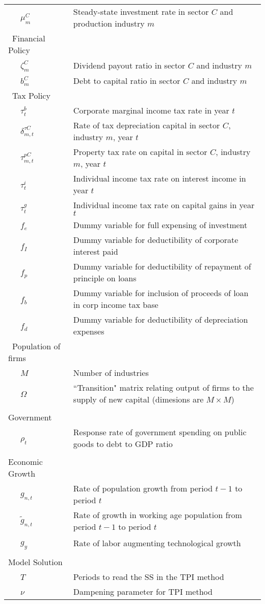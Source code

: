 \documentclass[letterpaper,12pt]{article}
\theoremstyle{definition}
\begin{document}
\begin{table}[h!]
\begin{tabular}{ll}
    \ \ \ $\mu^{C}_{m}$ & Steady-state investment rate in sector $C$ and production industry $m$ \\
    \ Financial Policy &  \\
    \ \ \ $\zeta^{C}_{m}$ & Dividend payout ratio in sector $C$ and industry $m$ \\
    \ \ \ $b^{C}_{m}$ & Debt to capital ratio in sector $C$ and industry $m$ \\
    \ Tax Policy &  \\
    \ \ \ $\tau^{b}_{t}$ & Corporate marginal income tax rate in year $t$ \\
    \ \ \ $\delta^{\tau C}_{m,t}$ & Rate of tax depreciation capital in sector $C$, industry $m$, year $t$ \\
    \ \ \ $\tau^{pC}_{m,t}$ & Property tax rate on capital in sector $C$, industry $m$, year $t$ \\
    \ \ \ $\tau^{i}_{t}$ & Individual income tax rate on interest income in year $t$ \\
    \ \ \ $\tau^{g}_{t}$ & Individual income tax rate on capital gains in year $t$ \\
    \ \ \ $f_{e}$ & Dummy variable for full expensing of investment  \\
    \ \ \ $f_{I}$ & Dummy variable for deductibility of corporate interest paid \\
    \ \ \ $f_{p}$ & Dummy variable for deductibility of repayment of principle on loans \\
    \ \ \ $f_{b}$ & Dummy variable for inclusion of proceeds of loan in corp income tax base \\
    \ \ \ $f_{d}$ & Dummy variable for deductibility of depreciation expenses \\
    \ Population of firms &  \\
    \ \ \ $M$ & Number of industries \\
    \ \ \ $\Omega$ & ``Transition" matrix relating output of firms to the supply of new capital (dimesions are $M\times M$) \\
          &  \\
    Government &  \\
    \ \ \ $\rho_{t}$ & Response rate of government spending on public goods to debt to GDP ratio \\
          &  \\
    Economic Growth &  \\
    \ \ \ $g_{n,t}$ & Rate of population growth from period $t-1$ to period $t$ \\
    \ \ \ $\tilde{g}_{n,t}$ & Rate of growth in working age population from period $t-1$ to period $t$ \\
    \ \ \ $g_{y}$ & Rate of labor augmenting technological growth \\
          &  \\
    Model Solution &  \\
    \ \ \ $T$ & Periods to read the SS in the TPI method \\
    \ \ \ $\nu$ & Dampening parameter for TPI method \\
    \hline
    \hline
    \end{tabular}%
  \label{tab:addlabel}%
\end{table}%
\end{document}
